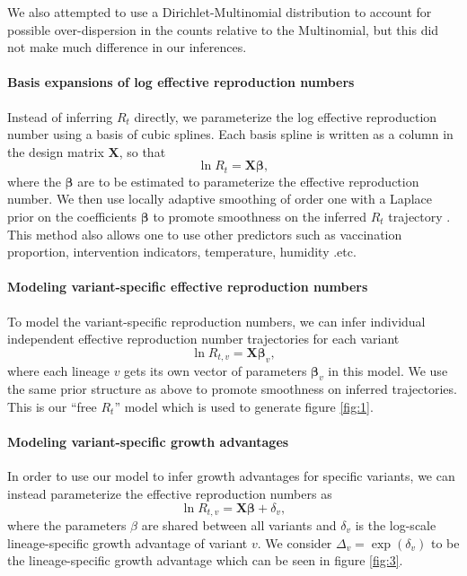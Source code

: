 \documentclass[12pt]{article}
\renewcommand{\vec}[1]{\boldsymbol{#1}}
\begin{document}
We also attempted to use a Dirichlet-Multinomial distribution to account for possible over-dispersion in the counts relative to the Multinomial, but this did not make much difference in our inferences.

\paragraph{Basis expansions of log effective reproduction numbers}%

Instead of inferring $R_{t}$ directly, we parameterize the log effective reproduction number using a basis of cubic splines.
Each basis spline is written as a column in the design matrix $\vec{X}$, so that
\begin{equation}
  \ln R_{t} = \vec{X} \vec{\beta},
\end{equation}
where the $\vec{\beta}$ are to be estimated to parameterize the effective reproduction number.
We then use locally adaptive smoothing of order one with a Laplace prior on the coefficients $\vec{\beta}$ to promote smoothness on the inferred $R_t$ trajectory \cite{Faulkner2018}.
This method also allows one to use other predictors such as vaccination proportion, intervention indicators, temperature, humidity .etc.

\paragraph{Modeling variant-specific effective reproduction numbers}%

To model the variant-specific reproduction numbers, we can infer individual independent effective reproduction number trajectories for each variant
\begin{equation}
  \ln R_{t, v} = \vec{X} \vec{\beta}_{v},
\end{equation}
where each lineage $v$ gets its own vector of parameters $\vec{\beta}_{v}$ in this model.
We use the same prior structure as above to promote smoothness on inferred trajectories. This is our ``free $R_{t}$'' model which is used to generate figure \ref{fig:1}.

\paragraph{Modeling variant-specific growth advantages}%

In order to use our model to infer growth advantages for specific variants, we can instead parameterize the effective reproduction numbers as
\begin{equation}
\ln R_{t,v} = \vec{X} \vec{\beta} + \delta_{v},
\end{equation}
where the parameters $\beta$ are shared between all variants and $\delta_{v}$ is the log-scale lineage-specific growth advantage of variant $v$.
We consider $\Delta_{v} = \exp(\delta_{v})$ to be the lineage-specific growth advantage which can be seen in figure \ref{fig:3}.
\end{document}
